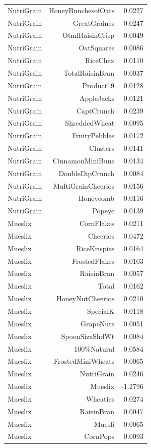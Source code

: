 \begin{longtable}{@{}lrr@{}}
NutriGrain & HoneyBunchesofOats & 0.0227 \\
NutriGrain & GreatGraines & 0.0247 \\
NutriGrain & OtmlRaisinCrisp & 0.0049 \\
NutriGrain & OatSquares & 0.0086 \\
NutriGrain & RiceChex & 0.0110 \\
NutriGrain & TotalRaisinBran & 0.0037 \\
NutriGrain & Product19 & 0.0128 \\
NutriGrain & AppleJacks & 0.0121 \\
NutriGrain & CaptCrunch & 0.0239 \\
NutriGrain & ShreddedWheat & 0.0095 \\
NutriGrain & FruityPebbles & 0.0172 \\
NutriGrain & Clusters & 0.0141 \\
NutriGrain & CinnamonMiniBuns & 0.0134 \\
NutriGrain & DoubleDipCrunch & 0.0084 \\
NutriGrain & MultiGrainCheerios & 0.0156 \\
NutriGrain & Honeycomb & 0.0116 \\
NutriGrain & Popeye & 0.0139 \\
Mueslix & CornFlakes & 0.0211 \\
Mueslix & Cheerios & 0.0472 \\
Mueslix & RiceKrispies & 0.0164 \\
Mueslix & FrostedFlakes & 0.0103 \\
Mueslix & RaisinBran & 0.0057 \\
Mueslix & Total & 0.0162 \\
Mueslix & HoneyNutCheerios & 0.0210 \\
Mueslix & SpecialK & 0.0118 \\
Mueslix & GrapeNuts & 0.0051 \\
Mueslix & SpoonSizeShdWt & 0.0084 \\
Mueslix & 100\%Natural & 0.0584 \\
Mueslix & FrostedMiniWheats & 0.0065 \\
Mueslix & NutriGrain & 0.0246 \\
Mueslix & Mueslix & -1.2796 \\
Mueslix & Wheaties & 0.0274 \\
Mueslix & RaisinBran & 0.0047 \\
Mueslix & Muesli & 0.0065 \\
Mueslix & CornPops & 0.0093 \\

\end{longtable}
